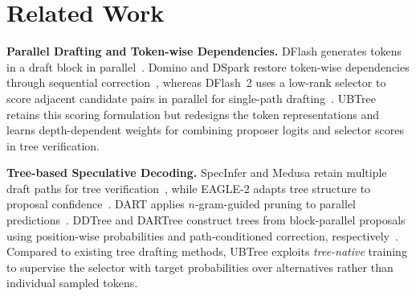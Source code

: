 \section{Related Work}
\label{sec:related-work}

\noindent\textbf{Parallel Drafting and Token-wise Dependencies.}
DFlash generates tokens in a draft block in parallel~\citep{chen2026dflash}. Domino and DSpark restore token-wise dependencies through sequential correction~\citep{huang2026domino,cheng2026dspark}, whereas DFlash~2 uses a low-rank selector to score adjacent candidate pairs in parallel for single-path drafting~\citep{inco2026dflash2}. UBTree retains this scoring formulation but redesigns the token representations and learns depth-dependent weights for combining proposer logits and selector scores in tree verification.

\noindent\textbf{Tree-based Speculative Decoding.}
SpecInfer and Medusa retain multiple draft paths for tree verification~\citep{miao2024specinfer,cai2024medusa}, while EAGLE-2 adapts tree structure to proposal confidence~\citep{li2024eagle2}. DART applies $n$-gram-guided pruning to parallel predictions~\citep{liu2026dart}. DDTree and DARTree construct trees from block-parallel proposals using position-wise probabilities and path-conditioned correction, respectively~\citep{ringel2026accelerating,li2026dartree}. Compared to existing tree drafting methods, UBTree exploits \textit{tree-native} training to supervise the selector with target probabilities over alternatives rather than individual sampled tokens.
